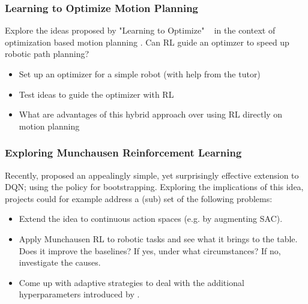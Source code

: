 \documentclass[a4paper]{article}
\begin{document}
\subsubsection{Learning to Optimize Motion Planning}
Explore the ideas proposed by "Learning to Optimize" ~\cite{LiM16b} in the context of optimization based motion planning \cite{Zucker2013}. Can RL guide an optimzer to speed up robotic path planning?
\begin{itemize}
  \item Set up an optimizer for a simple robot (with help from the tutor)
  \item Test ideas to guide the optimizer with RL
  \item What are advantages of this hybrid approach over using RL directly on motion planning
\end{itemize}

\subsubsection{Exploring Munchausen Reinforcement Learning}
Recently, \cite{vieillard2020munchausen} proposed an appealingly simple, yet surprisingly effective extension to DQN; using the policy for bootstrapping. Exploring the implications of this idea, projects could for example address a (sub) set of the following problems:
\begin{itemize}
	\item Extend the idea to continuous action spaces (e.g. by augmenting SAC).
	\item Apply Munchausen RL to robotic tasks and see what it brings to the table. Does it improve the baselines? If yes, under what circumstances? If no, investigate the causes.
	\item Come up with adaptive strategies to deal with the additional hyperparameters introduced by \cite{vieillard2020munchausen}.
\end{itemize}
\end{document}
